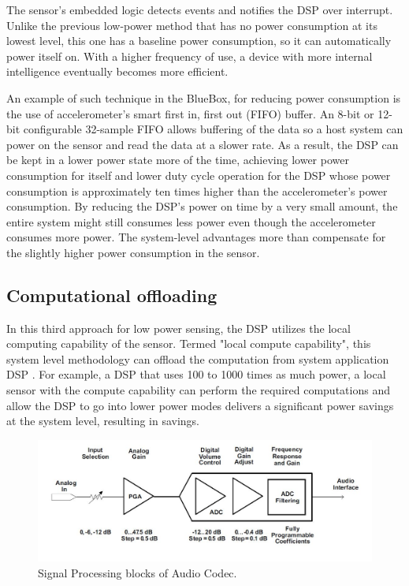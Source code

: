 The sensor's embedded logic detects events and notifies the DSP over interrupt. Unlike the previous low-power method that has no power consumption at its lowest level, this one has a baseline power consumption, so it can automatically power itself on. With a higher frequency of use, a device with more internal intelligence eventually becomes more efficient. 
 
 An example of such technique in the BlueBox, for reducing power consumption is the use of
 accelerometer’s smart first in, first out (FIFO) buffer. An 8-bit or 12-bit configurable 32-sample 
 FIFO allows buffering of the data so a host system can power on the sensor and read the 
 data at a slower rate. As a result, the DSP can be kept in a lower power state more of 
 the time, achieving lower power consumption for itself and lower duty cycle operation for 
 the DSP whose power consumption is approximately ten times 
 higher than the accelerometer’s power consumption. By reducing the DSP’s power 
 on time by a very small amount, the entire system might still consumes less power even though the accelerometer 
 consumes more power. The system-level advantages more than compensate for the slightly 
 higher power consumption in the sensor. 
 
 \subsection{Computational offloading}
 In this third approach for low power sensing, the DSP utilizes the local computing capability of the sensor. Termed "local compute capability", this system level methodology can offload the computation from system application DSP . For example, a DSP that uses 100 to 1000 times as much power, a local sensor with the compute capability can perform the required computations and allow the DSP to go into lower power modes delivers a significant power savings at the system level, resulting in savings.  
 
  \begin{figure}[h]
 	\centering
 	\includegraphics[scale = 0.5 ]{AIC_processingBlock.JPG}
 	\caption{Signal Processing blocks of Audio Codec. \cite{audiocodec} \label{AIC_processingBlock}}
 \end{figure}
 
